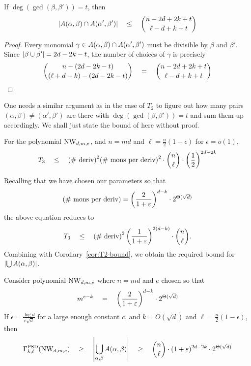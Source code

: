 \begin{observation}\label{obs:T3-proxy}
If $\deg(\gcd(\beta, \beta')) = t$, then
\[
\left|A(\alpha, \beta) \cap A(\alpha', \beta')\right| \quad \leq \quad \binom{n - 2d + 2k + t}{\ell - d + k +t}
\]
\end{observation}
\begin{proof}
Every monomial $\gamma \in A(\alpha, \beta) \cap A(\alpha', \beta')$ must be divisible by $\beta$ and $\beta'$. Since $\left|\beta \cup \beta'\right| = 2d - 2k - t$, the number of choices of $\gamma$ is precisely
\[
\binom{n - (2d - 2k -t)}{(\ell + d - k) - (2d - 2k - t)} \quad = \quad \binom{n - 2d + 2k + t}{\ell - d + k + t}\qedhere
\]
\end{proof}

One needs a similar argument as in the case of $T_2$ to figure out how many pairs $(\alpha, \beta) \neq (\alpha',\beta')$ are there with $\deg(\gcd(\beta, \beta')) = t$ and sum them up accordingly. We shall just state the bound of \cite{KS14} here without proof. 

\begin{lemma}[\cite{KS14}] \label{lem:T3-bound}
For the polynomial $\mathrm{NW}_{d,m,e}$, and $n = md$ and $\ell = \frac{n}{2}(1 - \epsilon)$ for $\epsilon = o(1)$, 
\[
T_3 \quad \leq \quad \text{(\# deriv)}^2 \text{(\# mons per deriv)}^2 \cdot \binom{n}{\ell}\cdot \left(\frac{1}{2}\right)^{2d - 2k}
\]
\end{lemma}

Recalling that we have chosen our parameters so that 
\[
\text{(\# mons per deriv)} = \left(\frac{2}{1+\varepsilon}\right)^{d-k} \cdot 2^{\Theta(\sqrt{d})}
\]
the above equation reduces to 
\[
T_3 \quad \leq \quad \text{(\# deriv)}^2 \left(\frac{1}{1+\varepsilon}\right)^{2(d-k)} \cdot \binom{n}{\ell}.
\]
Combining with Corollary~\ref{cor:T2-bound}, we obtain the required bound for $\left|\bigcup A(\alpha, \beta)\right|$. 

\begin{lemma}
Consider polynomial $\mathrm{NW}_{d,m,e}$ where $n = md$ and $e$ chosen so that
\[m^{e-k} \quad = \quad  \left(\frac{2}{1+\varepsilon}\right)^{d-k} \cdot 2^{\Theta(\sqrt{d})}\]
If $\epsilon = \frac{\log d}{c\sqrt{d}}$ for a large enough constant $c$, and $k = O(\sqrt{d})$ and $\ell = \frac{n}{2}(1 - \epsilon)$, then
\[
\Gamma^{\mathrm{PSD}}_{k,\ell}(\mathrm{NW}_{d,m,e})\quad \geq \quad\left|\bigcup_{\alpha, \beta} A(\alpha, \beta)\right| \quad \geq \quad \binom{n}{\ell} \cdot (1+\varepsilon)^{2d-2k} \cdot 2^{\Theta(\sqrt{d})}
\] 
\end{lemma}

